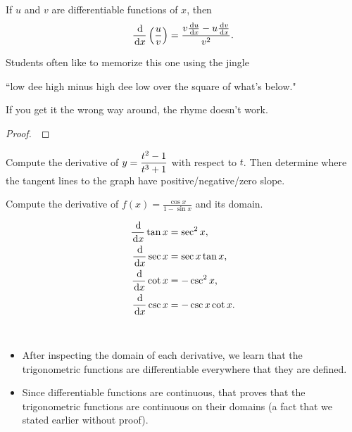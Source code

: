 \begin{theorem}
If $u$ and $v$ are differentiable functions of $x$, then
\begin{equation*}
\frac{\mkern 2mu \mathrm{d}}{\mkern 2mu \mathrm{d} x}\left(\frac{u}{v}\right) = \frac{v\frac{\mkern 2mu \mathrm{d} u}{\mkern 2mu \mathrm{d} x} - u\frac{\mkern 2mu \mathrm{d} v}{\mkern 2mu \mathrm{d} x}}{v^2}.
\end{equation*}
\end{theorem}
\begin{remark}
Students often like to memorize this one using the jingle 
\begin{center}
``low dee high minus high dee low over the square of what's below."
\end{center}
If you get it the wrong way around, the rhyme doesn't work.
\end{remark}
\begin{proof}\,

\vspace{5in}
\end{proof}

\newpage

\begin{example}
Compute the derivative of $y =\displaystyle\frac{t^2-1}{t^3+1}$ with respect to $t$.
Then determine where the tangent lines to the graph have positive/negative/zero slope.
\end{example}

\newpage

\begin{example}
Compute the derivative of $f(x) = \frac{\cos x}{1-\sin x}$ and its domain.
\end{example}

\newpage

\begin{theorem}
\begin{align*}
\frac{\mkern 2mu \mathrm{d}}{\mkern 2mu \mathrm{d} x}\tan x &= \sec^2 x,\\
\frac{\mkern 2mu \mathrm{d}}{\mkern 2mu \mathrm{d} x}\sec x &=\sec x\tan x,\\
\frac{\mkern 2mu \mathrm{d}}{\mkern 2mu \mathrm{d} x}\cot x &=-\csc^2 x,\\
\frac{\mkern 2mu \mathrm{d}}{\mkern 2mu \mathrm{d} x}\csc x &=-\csc x\cot x.
\end{align*}
\end{theorem}
\begin{remark}\,
\begin{itemize}
\item After inspecting the domain of each derivative, we learn that the trigonometric functions are differentiable everywhere that they are defined.
\item Since differentiable functions are continuous, that proves that the trigonometric functions are continuous on their domains (a fact that we stated earlier without proof).
\end{itemize}
\end{remark}

